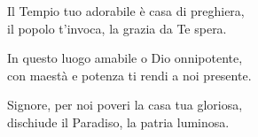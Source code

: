 

\spazio

\strofa Il Tempio tuo adorabile è casa di preghiera,\\
il popolo t'invoca, la grazia da Te spera.

\spazio


\spazio

\strofa In questo luogo amabile o Dio onnipotente,\\
con maestà e potenza ti rendi a noi presente.

\spazio


\spazio

\strofa Signore, per noi poveri la casa tua gloriosa,\\
dischiude il Paradiso, la patria luminosa.

\spazio


